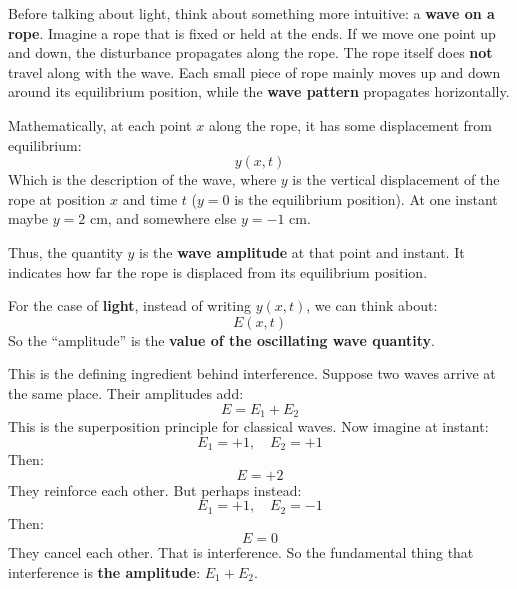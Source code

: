 \begin{deepeningbox}
    Before talking about light, think about something more intuitive: a \textbf{wave on a rope}. Imagine a rope that is fixed or held at the ends. If we move one point up and down, the disturbance propagates along the rope. The rope itself does \textbf{not} travel along with the wave. Each small piece of rope mainly moves up and down around its equilibrium position, while the \textbf{wave pattern} propagates horizontally.

    \highspace
    Mathematically, at each point $x$ along the rope, it has some displacement from equilibrium:
    \begin{equation*}
        y(x,t)
    \end{equation*}
    Which is the description of the wave, where $y$ is the vertical displacement of the rope at position $x$ and time $t$ ($y=0$ is the equilibrium position). At one instant maybe $y = 2$ cm, and somewhere else $y = -1$ cm.

    \highspace
    Thus, the quantity $y$ is the \textbf{wave amplitude} at that point and instant. It indicates how far the rope is displaced from its equilibrium position.

    \highspace
    For the case of \textbf{light}, instead of writing $y(x,t)$, we can think about:
    \begin{equation*}
        E(x, t)
    \end{equation*}
    So the ``amplitude'' is the \textbf{value of the oscillating wave quantity}.
\end{deepeningbox}

\highspace
\begin{deepeningbox}
    This is the defining ingredient behind interference. Suppose two waves arrive at the same place. Their amplitudes add:
    \begin{equation*}
        E = E_1 + E_2
    \end{equation*}
    This is the superposition principle for classical waves. Now imagine at instant:
    \begin{equation*}
        E_1 = +1, \quad E_2 = +1
    \end{equation*}
    Then:
    \begin{equation*}
        E = +2
    \end{equation*}
    They reinforce each other. But perhaps instead:
    \begin{equation*}
        E_1 = +1, \quad E_2 = -1
    \end{equation*}
    Then:
    \begin{equation*}
        E = 0
    \end{equation*}
    They cancel each other. That is interference. So the fundamental thing that interference is \textbf{the amplitude}: $E_1 + E_2$.
\end{deepeningbox}

